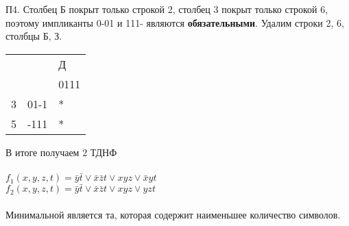 \documentclass{article}
\begin{document}
	П4. Столбец Б покрыт только строкой 2, столбец 3 покрыт только строкой 6, поэтому
	импликанты 0-01 и 111- являются \textbf{обязательными}. Удалим строки 2, 6, столбцы
	Б, З.
	
	\begin{table}[ht]
		\centering
		\begin{tabular}{|ll|l|}
			\hline
			\multicolumn{2}{|l|}{\multirow{2}{*}{}} & Д    \\ \cline{3-3} 
			\multicolumn{2}{|l|}{}                  & 0111 \\ \hline
			\multicolumn{1}{|l|}{3}      & 01-1     & *    \\ \hline
			\multicolumn{1}{|l|}{5}      & -111     & *    \\ \hline
		\end{tabular}
	\end{table}
	
	В итоге получаем 2 ТДНФ
	\\\\
	$f_1 (x, y, z, t) = \bar{y} \bar{t} \vee \bar{x} \bar{z} t \vee xyz \vee \bar{x} yt$
	\\
	$f_2 (x, y, z, t) = \bar{y} \bar{t} \vee \bar{x} \bar{z} t \vee xyz \vee yzt$
	\\\\
	Минимальной является та, которая содержит наименьшее количество символов.
	
\end{document}

